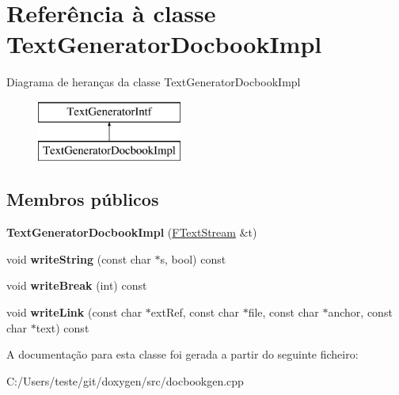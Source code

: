 \hypertarget{class_text_generator_docbook_impl}{\section{Referência à classe Text\-Generator\-Docbook\-Impl}
\label{class_text_generator_docbook_impl}
}
Diagrama de heranças da classe Text\-Generator\-Docbook\-Impl\begin{figure}[H]
\begin{center}
\leavevmode
\includegraphics[height=2.000000cm]{class_text_generator_docbook_impl}
\end{center}
\end{figure}
\subsection*{Membros públicos}
\begin{DoxyCompactItemize}
\item 
\hypertarget{class_text_generator_docbook_impl_a65e5ecdb77e63aba0c82ed5a982cb6f7}{{\bfseries Text\-Generator\-Docbook\-Impl} (\hyperlink{class_f_text_stream}{F\-Text\-Stream} \&t)}\label{class_text_generator_docbook_impl_a65e5ecdb77e63aba0c82ed5a982cb6f7}

\item 
\hypertarget{class_text_generator_docbook_impl_aa314bc3ac22ec70f185411f56a1c2756}{void {\bfseries write\-String} (const char $\ast$s, bool) const }\label{class_text_generator_docbook_impl_aa314bc3ac22ec70f185411f56a1c2756}

\item 
\hypertarget{class_text_generator_docbook_impl_a7c1fa93dbcc591404627e0dc47a64db3}{void {\bfseries write\-Break} (int) const }\label{class_text_generator_docbook_impl_a7c1fa93dbcc591404627e0dc47a64db3}

\item 
\hypertarget{class_text_generator_docbook_impl_a1c59b643d4316e056c36a14895ebddaa}{void {\bfseries write\-Link} (const char $\ast$ext\-Ref, const char $\ast$file, const char $\ast$anchor, const char $\ast$text) const }\label{class_text_generator_docbook_impl_a1c59b643d4316e056c36a14895ebddaa}

\end{DoxyCompactItemize}


A documentação para esta classe foi gerada a partir do seguinte ficheiro\-:\begin{DoxyCompactItemize}
\item 
C\-:/\-Users/teste/git/doxygen/src/docbookgen.\-cpp\end{DoxyCompactItemize}
